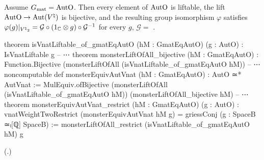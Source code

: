 \begin{theorem}\label{ch22:thm:equiv}
Assume $G_{\mathrm{mat}}=\mathrm{AutO}$.  Then every element of $\mathrm{AutO}$ is liftable, the lift
$\mathrm{AutO}\to\operatorname{Aut}({V^{\natural}})$ is bijective, and the resulting group isomorphism $\varphi$ satisfies
$\varphi(g)|_{{V^{\natural}}_2}=\mathcal G\circ(1_{\mathbb{C}}\otimes g)\circ\mathcal G^{-1}$ for every $g$, $\mathcal G=$ .
\end{theorem}
\begin{leancode}
theorem isVnatLiftable_of_gmatEqAutO (hM : GmatEqAutO) (g : AutO) : IsVnatLiftable g
-- ⋯
theorem monsterLiftOfAll_bijective (hM : GmatEqAutO) :
    Function.Bijective (monsterLiftOfAll (isVnatLiftable_of_gmatEqAutO hM))
-- ⋯
noncomputable def monsterEquivAutVnat (hM : GmatEqAutO) : AutO ≃* AutVnat :=
  MulEquiv.ofBijective (monsterLiftOfAll (isVnatLiftable_of_gmatEqAutO hM))
    (monsterLiftOfAll_bijective hM)
-- ⋯
theorem monsterEquivAutVnat_restrict (hM : GmatEqAutO) (g : AutO) :
    vnatWeightTwoRestrict (monsterEquivAutVnat hM g) =
      griessConj (g : SpaceB ≃ₗ[ℚ] SpaceB) :=
  monsterLiftOfAll_restrict (isVnatLiftable_of_gmatEqAutO hM) g
\end{leancode}
(.)
